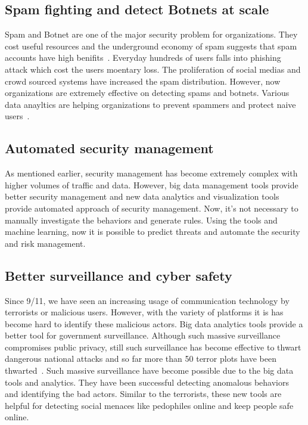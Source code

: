 \documentclass[sigconf]{acmart}
\begin{document}
\subsection*{Spam fighting and detect Botnets at scale}
Spam and Botnet are one of the major security problem for organizations. They cost useful resources and the underground economy of spam suggests that spam accounts have high benifits~\cite{Stone-Gross:2011}. Everyday hundreds of users falls into phishing attack which cost the users moentary loss. The proliferation of social medias and crowd sourced systems have increased the spam distribution. However, now organizations are extremely effective on detecting spams and botnets. Various data anayltics are helping organizations  to prevent spammers and protect naive users~\cite{SINGH:2014}. 

\subsection*{Automated security management}
As mentioned earlier, security management has become extremely complex with higher volumes of traffic and data. However, big data management tools provide better security management and new data analytics and visualization tools provide automated approach of security management. Now, it's not necessary to manually investigate the behaviors and generate rules. Using the tools and machine learning, now it is possible to predict threats and automate the security and risk management. 

\subsection*{Better surveillance and cyber safety}
Since 9/11, we have seen an increasing usage of communication technology by terrorists or malicious users. However, with the variety of platforms it is has become hard to identify these malicious actors. Big data analytics tools provide a better tool for government surveillance. Although such massive surveillance compromises public privacy, still such surveillance has become effective to thwart dangerous national attacks and so far more than 50 terror plots have been thwarted~\cite{nsa}. Such massive surveillance have become possible due to the big data tools and analytics. They have been successful detecting anomalous behaviors and identifying the bad actors. Similar to the terrorists, these new tools are helpful for detecting social menaces like pedophiles online and keep people safe online. 
\end{document}
